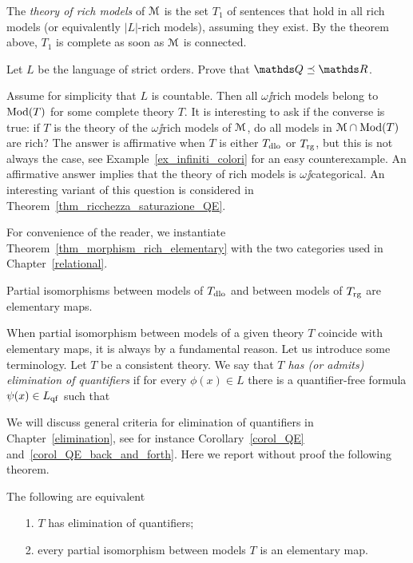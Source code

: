 \documentclass[creche.tex]{subfiles}
\begin{document}
The \emph{theory of rich models\/} of $\EuScript M$ is the set $T_1$ of sentences that hold in all rich models (or equivalently $|L|$-rich models), assuming they exist. By the theorem above, $T_1$ is complete as soon as $\EuScript M$ is connected.

\begin{exercise}
Let $L$ be the language of strict orders. Prove that $\QQ\preceq\RR$.\QED
\end{exercise}

Assume for simplicity that $L$ is countable. Then all $\omega\jj$rich models belong to $\mathop{\rm Mod}(T)$ for some complete theory $T$. It is interesting to ask if the converse is true: if $T$ is the theory of the $\omega\jj$rich models of $\EuScript M$, do all models in $\EuScript M\cap \mathop{\rm Mod}(T)$ are rich?  The answer is affirmative when $T$ is either $T_{\rm dlo}$ or $T_{\rm rg}$, but this is not always the case, see Example~\ref{ex_infiniti_colori} for an easy counterexample. An affirmative answer implies that the theory of rich models is $\omega\jj$categorical. An interesting variant of this question is considered in Theorem~\ref{thm_ricchezza_saturazione_QE}.

For convenience of the reader, we instantiate Theorem~\ref{thm_morphism_rich_elementary} with the two categories used in Chapter~\ref{relational}.

\begin{corollary}\label{coroll_tutteleimmersionisonoelementari_QE}
Partial isomorphisms between models of $T_{\rm dlo}$ and between models of $T_{\rm rg}$ are elementary maps.\QED
\end{corollary}

When partial isomorphism between models of a given theory $T$ coincide with elementary maps, it is always by a fundamental reason. Let us introduce some terminology. Let $T$ be a consistent theory. We say that \emph{$T$ has (or admits) elimination of\/} \emph{quantifiers\/} if for every $\phi(x)\in L$ there is a quantifier-free formula $\psi(x)\in L_{\rm qf}$ such that 


We will discuss general criteria for elimination of quantifiers in Chapter~\ref{elimination}, see for instance Corollary~\ref{corol_QE} and~\ref{corol_QE_back_and_forth}. Here we report without proof the following theorem.

\begin{theorem}\label{thm_tutteleimmersionisonoelementari_QE}
The following are equivalent
\begin{itemize}
\item[1.] $T$ has elimination of quantifiers;
\item[2.] every partial isomorphism between models $T$ is an elementary map.\QED
\end{itemize}
\end{theorem}
\end{document}
